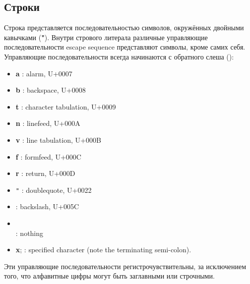 \subsection{Строки}

\vest Строка представляется последовательностью символов, окружённых двойными кавычками
({\bfseries\cf "}). Внутри стрового литерала различные управляющие последовательности\mainindex
{escape sequence} представляют символы, кроме самих себя. Управляющие последовательности
всегда начинаются с обратного слеша ({\bfseries\backwhack{}}):


\begin{itemize}
\item{\bfseries\cf\backwhack{}a} : alarm, U+0007
\item{\bfseries\cf\backwhack{}b} : backspace, U+0008
\item{\bfseries\cf\backwhack{}t} : character tabulation, U+0009
\item{\bfseries\cf\backwhack{}n} : linefeed, U+000A
\item{\bfseries\cf\backwhack{}v} : line tabulation, U+000B
\item{\bfseries\cf\backwhack{}f} : formfeed, U+000C
\item{\bfseries\cf\backwhack{}r} : return, U+000D
\item{\bfseries\cf\backwhack{}}\verb|"| : doublequote, U+0022
\item{\bfseries\cf\backwhack{}\backwhack{}} : backslash, U+005C
\item{\bfseries\cf\backwhack{}}\\\hspace*{2em} : nothing
\item{{\bfseries\cf\backwhack{}x};} : specified character (note the
  terminating semi-colon).
\end{itemize}

Эти управляющие последовательности регистрочувствительны, за исключением того, что алфавитные
цифры  могут быть заглавными или строчными.

